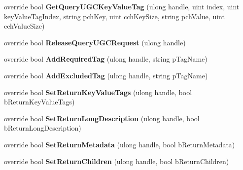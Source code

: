 \begin{DoxyCompactItemize}
\item 
\hypertarget{classValve_1_1Steamworks_1_1CSteamUGC_a297965b68ae16ea72bedee825ffc8947}{}override bool {\bfseries Get\+Query\+U\+G\+C\+Key\+Value\+Tag} (ulong handle, uint index, uint key\+Value\+Tag\+Index, string pch\+Key, uint cch\+Key\+Size, string pch\+Value, uint cch\+Value\+Size)\label{classValve_1_1Steamworks_1_1CSteamUGC_a297965b68ae16ea72bedee825ffc8947}

\item 
\hypertarget{classValve_1_1Steamworks_1_1CSteamUGC_a1245067bce6415a8d69ce98b9cfb32e6}{}override bool {\bfseries Release\+Query\+U\+G\+C\+Request} (ulong handle)\label{classValve_1_1Steamworks_1_1CSteamUGC_a1245067bce6415a8d69ce98b9cfb32e6}

\item 
\hypertarget{classValve_1_1Steamworks_1_1CSteamUGC_a0dd3f3343a05669d39ece7d0cd6a9b7e}{}override bool {\bfseries Add\+Required\+Tag} (ulong handle, string p\+Tag\+Name)\label{classValve_1_1Steamworks_1_1CSteamUGC_a0dd3f3343a05669d39ece7d0cd6a9b7e}

\item 
\hypertarget{classValve_1_1Steamworks_1_1CSteamUGC_aa38eefddf8aa16b7556c395a7bc2878b}{}override bool {\bfseries Add\+Excluded\+Tag} (ulong handle, string p\+Tag\+Name)\label{classValve_1_1Steamworks_1_1CSteamUGC_aa38eefddf8aa16b7556c395a7bc2878b}

\item 
\hypertarget{classValve_1_1Steamworks_1_1CSteamUGC_a0df4103e4f6f4c4f64ae99dd528f6e5e}{}override bool {\bfseries Set\+Return\+Key\+Value\+Tags} (ulong handle, bool b\+Return\+Key\+Value\+Tags)\label{classValve_1_1Steamworks_1_1CSteamUGC_a0df4103e4f6f4c4f64ae99dd528f6e5e}

\item 
\hypertarget{classValve_1_1Steamworks_1_1CSteamUGC_aedc9a016fda28bdee653a02b8ffb3f98}{}override bool {\bfseries Set\+Return\+Long\+Description} (ulong handle, bool b\+Return\+Long\+Description)\label{classValve_1_1Steamworks_1_1CSteamUGC_aedc9a016fda28bdee653a02b8ffb3f98}

\item 
\hypertarget{classValve_1_1Steamworks_1_1CSteamUGC_a5f527738ef3b2fccdc435b3d71b43675}{}override bool {\bfseries Set\+Return\+Metadata} (ulong handle, bool b\+Return\+Metadata)\label{classValve_1_1Steamworks_1_1CSteamUGC_a5f527738ef3b2fccdc435b3d71b43675}

\item 
\hypertarget{classValve_1_1Steamworks_1_1CSteamUGC_ab2c1dcec4605c85bf2d314fdd65db38a}{}override bool {\bfseries Set\+Return\+Children} (ulong handle, bool b\+Return\+Children)\label{classValve_1_1Steamworks_1_1CSteamUGC_ab2c1dcec4605c85bf2d314fdd65db38a}


\end{DoxyCompactItemize}
